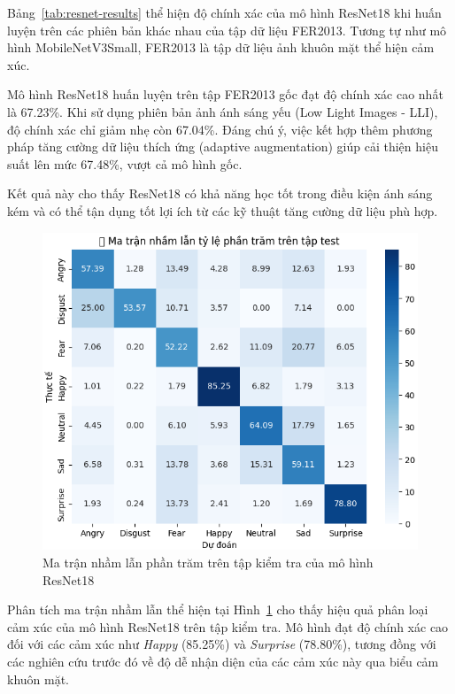 Bảng~\ref{tab:resnet-results} thể hiện độ chính xác của mô hình ResNet18 khi huấn luyện trên các phiên bản khác nhau của tập dữ liệu FER2013. Tương tự như mô hình MobileNetV3Small, FER2013 là tập dữ liệu ảnh khuôn mặt thể hiện cảm xúc.

Mô hình ResNet18 huấn luyện trên tập FER2013 gốc đạt độ chính xác cao nhất là 67.23\%. Khi sử dụng phiên bản ảnh ánh sáng yếu (Low Light Images - LLI), độ chính xác chỉ giảm nhẹ còn 67.04\%. Đáng chú ý, việc kết hợp thêm phương pháp tăng cường dữ liệu thích ứng (adaptive augmentation) giúp cải thiện hiệu suất lên mức 67.48\%, vượt cả mô hình gốc.

Kết quả này cho thấy ResNet18 có khả năng học tốt trong điều kiện ánh sáng kém và có thể tận dụng tốt lợi ích từ các kỹ thuật tăng cường dữ liệu phù hợp.



\begin{figure}[H]
\centering
\includegraphics[width=1\textwidth]{img/confusionMatrixResnet18.png}
\caption{Ma trận nhầm lẫn phần trăm trên tập kiểm tra của mô hình ResNet18}
\label{fig:confusion-resnet18}
\end{figure}

Phân tích ma trận nhầm lẫn thể hiện tại Hình~\ref{fig:confusion-resnet18} cho thấy hiệu quả phân loại cảm xúc của mô hình ResNet18 trên tập kiểm tra. Mô hình đạt độ chính xác cao đối với các cảm xúc như \textit{Happy} (85.25\%) và \textit{Surprise} (78.80\%), tương đồng với các nghiên cứu trước đó về độ dễ nhận diện của các cảm xúc này qua biểu cảm khuôn mặt.

